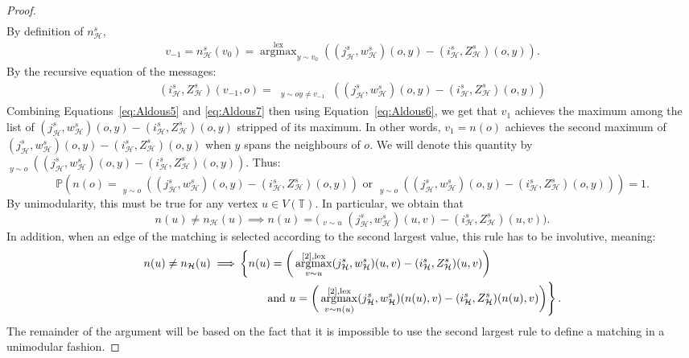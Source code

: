 \documentclass[11pt]{article}
\DeclareMathOperator{\lex}{lex}
\DeclareMathOperator*{\argmax}{argmax}
\DeclareMathOperator*{\argmaxxlex}{\overset{[2],\lex}{\argmax}}
\DeclareMathOperator*{\argmaxlex}{\overset{\lex}{\argmax}}
\DeclareMathOperator*{\maxlex}{\overset{\lex}{\max}}
\begin{document}
\begin{proof}
\begin{align}
\end{align}
By definition of $n^s_{\mathcal{H}}$,
\begin{align}\label{eq:Aldous6}
v_{-1}=n^s_{\mathcal{H}}(v_0) = \overset{\lex}{\argmax}_{y \sim v_0 }((j_{\mathcal{H}}^s,w_{\mathcal{H}}^s)(o,y)-(i^s_{\mathcal{H}},Z^s_{\mathcal{H}})(o,y)).
\end{align}
By the recursive equation of the messages: 
\begin{align}\label{eq:Aldous7}
    (i^s_{\mathcal{H}},Z^s_{\mathcal{H}})(v_{-1},o)=\maxlex_{\substack {y \sim o  y \neq v_{-1}}}((j_{\mathcal{H}}^s,w_{\mathcal{H}}^s)(o,y)-(i^s_{\mathcal{H}},Z^s_{\mathcal{H}})(o,y))    
\end{align}
Combining Equations~\eqref{eq:Aldous5} and \eqref{eq:Aldous7} then using Equation~\eqref{eq:Aldous6}, we get that $v_1$ achieves the maximum among the list of $(j_{\mathcal{H}}^s,w_{\mathcal{H}}^s)(o,y)-(i^s_{\mathcal{H}},Z^s_{\mathcal{H}})(o,y)$ stripped of its maximum. 
In other words, $v_1=n(o)$ achieves the second maximum of $(j_{\mathcal{H}}^s,w_{\mathcal{H}}^s)(o,y)-(i^s_{\mathcal{H}},Z^s_{\mathcal{H}})(o,y)$ when $y$ spans the neighbours of $o$. We will denote this quantity by ${\underset{y \sim o}{\argmaxxlex}}( (j_{\mathcal{H}}^s,w_{\mathcal{H}}^s)(o,y)-(i^s_{\mathcal{H}},Z^s_{\mathcal{H}})(o,y))$. 
Thus:
\[\mathbb{P}\left( n(o)=\underset{y \sim o}{\argmaxlex}((j_{\mathcal{H}}^s,w_{\mathcal{H}}^s)(o,y)-(i^s_{\mathcal{H}},Z^s_{\mathcal{H}})(o,y)) \text{ or } \underset{y \sim o}{\argmaxxlex}((j_{\mathcal{H}}^s,w_{\mathcal{H}}^s)(o,y)-(i^s_{\mathcal{H}},Z^s_{\mathcal{H}})(o,y))  \right)=1. \]
By unimodularity, this must be true for any vertex $u \in V(\mathbb{T})$. In particular, we obtain that
\[ n(u)\neq n_{\mathcal{H}}(u)  \implies n(u)= \bigg(\argmaxxlex_{v \sim u} (j_{\mathcal{H}}^s,w_{\mathcal{H}}^s)(u,v)-(i_{\mathcal{H}}^s,Z_{\mathcal{H}}^s)(u,v) \bigg) . \]
In addition, when an edge of the matching is selected according to the second largest value, this rule has to be involutive, meaning:
\begin{align} \label{eq:argmax2involutif}
    n(u)\neq n_{\mathcal{H}}(u)  \implies &\left\{  n(u)= \bigg(\argmaxxlex_{v \sim u} (j_{\mathcal{H}}^s,w_{\mathcal{H}}^s)(u,v)-(i_{\mathcal{H}}^s,Z_{\mathcal{H}}^s)(u,v) \bigg) \right. \notag \\
    & \qquad  \left. \text{ and } u= \bigg(\argmaxxlex_{v \sim n(u)} (j_{\mathcal{H}}^s,w_{\mathcal{H}}^s)(n(u),v)-(i_{\mathcal{H}}^s,Z_{\mathcal{H}}^s)(n(u),v) \bigg) \right\}.
\end{align}
The remainder of the argument will be based on the fact that it is impossible to use the second largest rule to define a matching in a unimodular fashion.


\end{proof}
\end{document}

